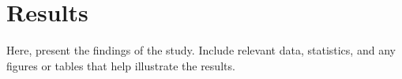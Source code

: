 \section{Results}
\label{sec:results}

Here, present the findings of the study. Include relevant data, statistics, and any figures or tables that help illustrate the results.


